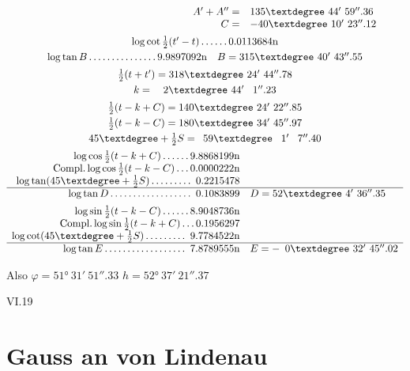 \documentclass[10pt,a4paper]{article}
\begin{document}
\[
\begin{array}{r@{\hspace{1em}}l}
A' + A'' = & 135°\ 44'\ 59''.36 \\
C = & -40°\ 10'\ 23''.12 \\[0.5em]
\multicolumn{2}{c}{\log\cot\tfrac{1}{2}(t' - t) \ldots\ldots 0.0113684\text{n}} \\[0.3em]
\multicolumn{2}{c}{\log\tan B \ldots\ldots\ldots\ldots\ldots 9.9897092\text{n} \quad B = 315°\ 40'\ 43''.55} \\[0.5em]
\multicolumn{2}{c}{\tfrac{1}{2}(t + t') = 318°\ 24'\ 44''.78} \\[0.3em]
\multicolumn{2}{c}{k = \phantom{31}2°\ 44'\ \phantom{4}1''.23} \\[0.5em]
\multicolumn{2}{c}{\tfrac{1}{2}(t - k + C) = 140°\ 24'\ 22''.85} \\[0.3em]
\multicolumn{2}{c}{\tfrac{1}{2}(t - k - C) = 180°\ 34'\ 45''.97} \\[0.3em]
\multicolumn{2}{c}{45° + \tfrac{1}{2}S = \phantom{1}59°\ \phantom{4}1'\ \phantom{4}7''.40} \\[0.5em]
\log\cos\tfrac{1}{2}(t - k + C) \ldots\ldots 9.8868199\text{n} & \\
\text{Compl.}\log\cos\tfrac{1}{2}(t - k - C) \ldots 0.0000222\text{n} & \\
\log\tan(45° + \tfrac{1}{2}S) \ldots\ldots\ldots\ 0.2215478 & \\
\hline
\log\tan D \ldots\ldots\ldots\ldots\ldots\ldots\ 0.1083899 & D = 52°\ 4'\ 36''.35 \\[0.5em]
\log\sin\tfrac{1}{2}(t - k - C) \ldots\ldots 8.9048736\text{n} & \\
\text{Compl.}\log\sin\tfrac{1}{2}(t - k + C) \ldots 0.1956297 & \\
\log\cot(45° + \tfrac{1}{2}S) \ldots\ldots\ldots\ 9.7784522\text{n} & \\
\hline
\log\tan E \ldots\ldots\ldots\ldots\ldots\ldots\ 7.8789555\text{n} & E = -\phantom{1}0°\ 32'\ 45''.02
\end{array}
\]

\begin{center}
Also $\varphi = 51°\ 31'\ 51''.33$ \quad $h = 52°\ 37'\ 21''.37$
\end{center}

\vspace{1em}
\noindent\textsc{VI.}\hfill 19

\clearpage
\section*{Gauss an von Lindenau}
\end{document}
